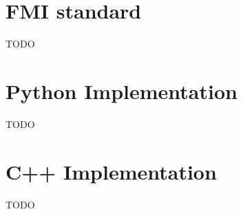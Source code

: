 \documentclass[conference]{IEEEtran}
\begin{document}
\section{FMI standard}

TODO

\section{Python Implementation}

TODO

\section{C++ Implementation}

TODO


\printbibliography
\end{document}
